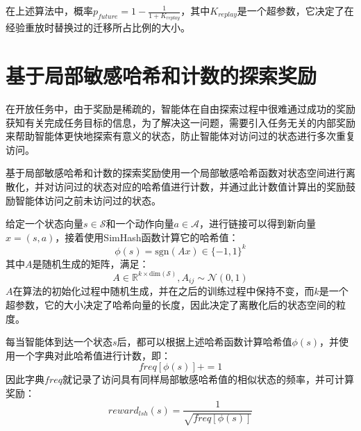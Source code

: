     在上述算法中，概率$p_{future}=1-\frac{1}{1+K_{replay}}$，其中$K_{replay}$是一个超参数，它决定了在经验重放时替换过的迁移所占比例的大小。

    \section{基于局部敏感哈希和计数的探索奖励}\label{LSHsec}
    在开放任务中，由于奖励是稀疏的，智能体在自由探索过程中很难通过成功的奖励获知有关完成任务目标的信息，为了解决这一问题，需要引入任务无关的内部奖励来帮助智能体更快地探索有意义的状态，防止智能体对访问过的状态进行多次重复访问。

    基于局部敏感哈希和计数的探索奖励\cite{DBLP:journals/corr/TangHFSCDSTA16,671516,conf/stoc/Charikar02}使用一个局部敏感哈希函数对状态空间进行离散化，并对访问过的状态对应的哈希值进行计数，并通过此计数值计算出的奖励鼓励智能体访问之前未访问过的状态。

    给定一个状态向量$s\in \mathcal S$和一个动作向量$a\in \mathcal A$，进行链接可以得到新向量$x=(s,a)$，接着使用SimHash函数计算它的哈希值：
    $$\phi(s)=\mathrm{sgn}(A x)\in\{-1,1\}^k$$
    其中$A$是随机生成的矩阵，满足：
    $$A\in \mathbb R^{k\times \mathrm{dim}(\mathcal S)}, A_{ij}\sim \mathcal N(0,1)$$ 
    $A$在算法的初始化过程中随机生成，并在之后的训练过程中保持不变，而$k$是一个超参数，它的大小决定了哈希向量的长度，因此决定了离散化后的状态空间的粒度。

    每当智能体到达一个状态$s$后，都可以根据上述哈希函数计算哈希值$\phi(s)$，并使用一个字典对此哈希值进行计数，即：
    $$freq[\phi(s)] += 1$$
    因此字典$freq$就记录了访问具有同样局部敏感哈希值的相似状态的频率，并可计算奖励：
    $$ reward_{lsh}(s)=\frac{1}{\sqrt{freq[\phi(s)]}}$$ 


%    
%
%
%
